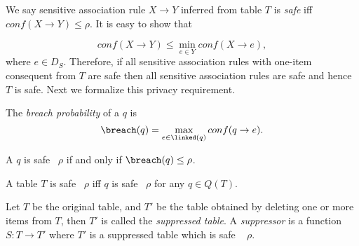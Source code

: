 We say sensitive association rule $X \rightarrow Y$ inferred from table $T$
is {\em safe} iff $conf(X \rightarrow Y) \leq \rho$. It is easy to show that

\begin{equation}
conf(X \rightarrow Y) \leq \min_{e \in Y} conf(X \rightarrow e),
\end{equation}
where $e \in D_S$. Therefore, if all sensitive association rules with
one-item consequent from $T$ are safe then all sensitive association rules
are safe and hence $T$ is safe. Next we formalize this privacy requirement.

\begin{definition}
\label{def:probability} The \emph{breach probability} of a \qid $q$ is
\begin{equation}
\breach(q) = \max_{e\in\linked(q)} conf(q \rightarrow e).
\end{equation}
\end{definition}

\begin{definition}
\label{def:safety_qid}
A \qid $q$ is safe \wrt~$\rho$ if and only if $\breach(q)\leq\rho$.
\end{definition}

\begin{definition}
\label{def:safety_table}
A table $T$ is safe \wrt~$\rho$ iff $q$ is safe \wrt~$\rho$ for any
\qid $q\in Q(T)$.
\end{definition}



\begin{definition}[Suppressor]
\label{def:suppressor}
Let $T$ be the original table, and $T'$ be the table obtained by deleting
one or more items from $T$, then $T'$ is called the {\em suppressed table}.
A \emph{suppressor} is a function
$S : T \rightarrow T'$ where $T'$ is a suppressed table which is
safe \wrt~ $\rho$.
\end{definition}

